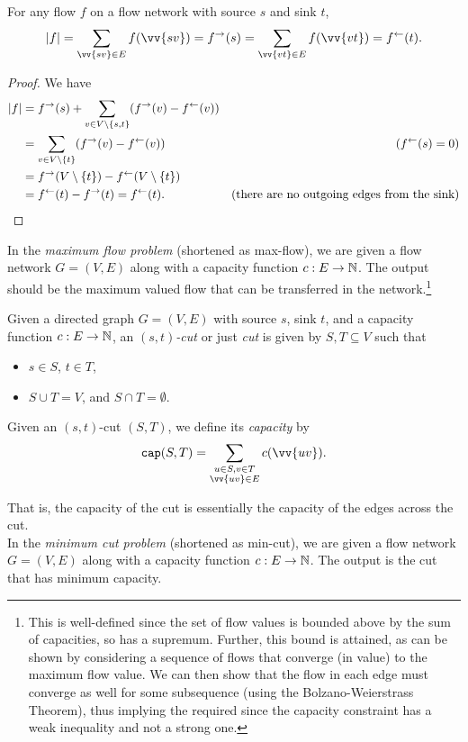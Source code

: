 \begin{lemma}
	For any flow $f$ on a flow network with source $s$ and sink $t$,
	\[ |f| = \sum_{\vv{sv}\in E}f(\vv{sv}) = f^{\to}(s) = \sum_{\vv{vt}\in E}f(\vv{vt}) = f^{\ot}(t). \]
\end{lemma}
\begin{proof}
	We have
	\begin{align*}
		|f| &= f^{\to}(s) + \sum_{v\in V\setminus\{s,t\}} (f^\to(v) - f^\leftarrow(v)) \\
			&= \sum_{v\in V\setminus \{t\}} (f^\to(v) - f^\leftarrow(v)) & (f^\leftarrow(s)=0) \\
			&= f^\to(V\setminus\{t\}) - f^\leftarrow(V\setminus\{t\}) \\
			&= f^\leftarrow(t) - f^\to(t) = f^\leftarrow(t). & (\text{there are no outgoing edges from the sink})
	\end{align*}
\end{proof}

In the \textit{maximum flow problem} (shortened as max-flow), we are given a flow network $G=(V,E)$ along with a capacity function $c:E\to\mathbb{N}$. The output should be the maximum valued flow that can be transferred in the network.\footnote{This is well-defined since the set of flow values is bounded above by the sum of capacities, so has a supremum. Further, this bound is attained, as can be shown by considering a sequence of flows that converge (in value) to the maximum flow value. We can then show that the flow in each edge must converge as well for some subsequence (using the Bolzano-Weierstrass Theorem), thus implying the required since the capacity constraint has a weak inequality and not a strong one.}

\begin{fdef}
	Given a directed graph $G=(V,E)$ with source $s$, sink $t$, and a capacity function $c:E\to\mathbb{N}$, an \textit{$(s,t)$-cut} or just \textit{cut} is given by $S,T\subseteq V$ such that
	\begin{itemize}
		\item $s\in S$, $t\in T$,
		\item $S\cup T=V$, and $S\cap T=\emptyset$.
	\end{itemize}
	Given an $(s,t)$-cut $(S,T)$, we define its \textit{capacity} by
	\[ \capp(S,T) = \sum_{\substack{u\in S, v\in T \\ \vv{uv}\in E}} c(\vv{uv}). \]
\end{fdef}

That is, the capacity of the cut is essentially the capacity of the edges across the cut.\\
In the \textit{minimum cut problem} (shortened as min-cut), we are given a flow network $G=(V,E)$ along with a capacity function $c:E\to\mathbb{N}$. The output is the cut that has minimum capacity.

